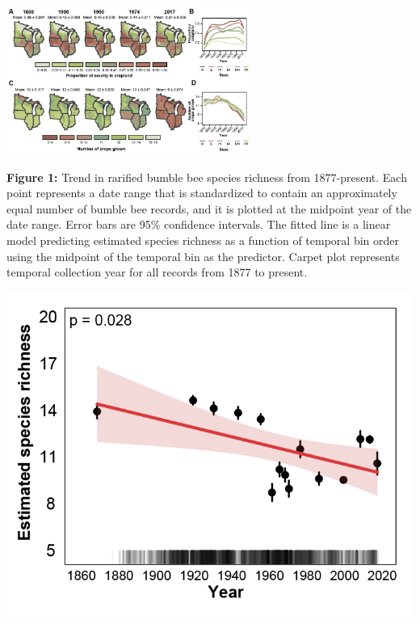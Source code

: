 \documentclass[11pt,]{article}
\begin{document}
\includegraphics[width=0.6\textwidth,height=\textheight]{../ms_figs/fig1.png}

\textbf{Figure 1:} Trend in rarified bumble bee species richness from
1877-present. Each point represents a date range that is standardized to
contain an approximately equal number of bumble bee records, and it is
plotted at the midpoint year of the date range. Error bars are 95\%
confidence intervals. The fitted line is a linear model predicting
estimated species richness as a function of temporal bin order using the
midpoint of the temporal bin as the predictor. Carpet plot represents
temporal collection year for all records from 1877 to present.

\clearpage

\newpage

\includegraphics[width=1\textwidth,height=\textheight]{../ms_figs/fig2.png}
\end{document}
